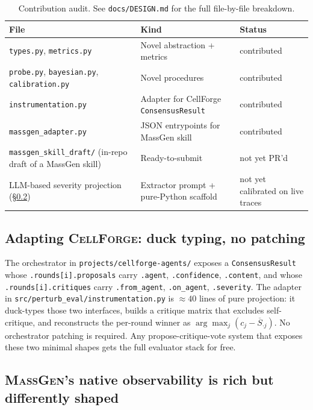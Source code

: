 \documentclass[10pt,a4paper]{article}
\begin{document}
\begin{table}[h]
\small
\centering
\begin{tabular}{lll}
\toprule
File & Kind & Status \\
\midrule
\texttt{types.py}, \texttt{metrics.py} & Novel abstraction + metrics & contributed \\
\texttt{probe.py}, \texttt{bayesian.py}, \texttt{calibration.py} & Novel procedures & contributed \\
\texttt{instrumentation.py} & Adapter for CellForge \texttt{ConsensusResult} & contributed \\
\texttt{massgen\_adapter.py} & JSON entrypoints for MassGen skill & contributed \\
\texttt{massgen\_skill\_draft/} (in-repo draft of a MassGen skill) & Ready-to-submit & not yet PR'd \\
LLM-based severity projection (\S\ref{subsec:massgen_bridge}) & Extractor prompt + pure-Python scaffold & not yet calibrated on live traces \\
\bottomrule
\end{tabular}
\caption{Contribution audit. See \texttt{docs/DESIGN.md} for the full file-by-file breakdown.}
\label{tab:contrib}
\end{table}

\subsection{Adapting \textsc{CellForge}: duck typing, no patching}

The orchestrator in \texttt{projects/cellforge-agents/} exposes a
\texttt{ConsensusResult} whose \texttt{.rounds[i].proposals} carry
\texttt{.agent}, \texttt{.confidence}, \texttt{.content}, and whose
\texttt{.rounds[i].critiques} carry \texttt{.from\_agent},
\texttt{.on\_agent}, \texttt{.severity}. The adapter in
\texttt{src/perturb\_eval/instrumentation.py} is $\approx\!40$ lines of
pure projection: it duck-types those two interfaces, builds a critique
matrix that excludes self-critique, and reconstructs the per-round winner
as $\arg\max_j (c_j - \overline{S}_{\cdot j})$. No orchestrator patching is
required. Any propose-critique-vote system that exposes these two minimal
shapes gets the full evaluator stack for free.

\subsection{\textsc{MassGen}'s native observability is rich but differently
shaped}\label{subsec:massgen_bridge}
\end{document}
